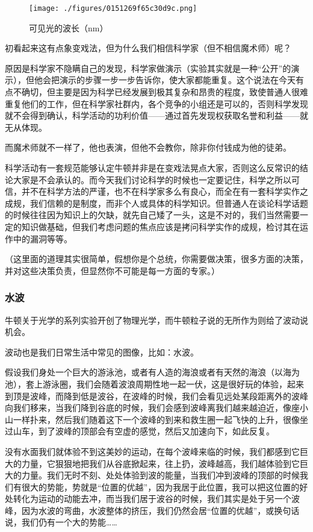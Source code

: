 \begin{figure}[ht]
\centering
\texttt{[image: ./figures/0151269f65c30d9c.png]}
\caption{可见光的波长（nm）} \label{fig_QMPre5_5}
\end{figure}

初看起来这有点象变戏法，但为什么我们相信科学家（但不相信魔术师）呢？

原因是科学家不隐瞒自己的发现，科学家做演示（实验其实就是一种“公开”的演示），但他会把演示的步骤一步一步告诉你，使大家都能重复。这个说法在今天有点不确切，但主要是因为科学已经发展到极其复杂和昂贵的程度，致使普通人很难重复他们的工作，但在科学家社群内，各个竞争的小组还是可以的，否则科学发现就不会得到确认，科学活动的功利价值——通过首先发现权获取名誉和利益——就无从体现。

而魔术师就不一样了，他也表演，但他不会教你，除非你付钱成为他的徒弟。

科学活动有一套规范能够认定牛顿并非是在变戏法晃点大家，否则这么反常识的结论大家是不会承认的。而今天我们讨论科学的时候也一定要记住，科学之所以可信，并不在科学方法的严谨，也不在科学家多么有良心，而全在有一套科学实作之成规，我们信赖的是制度，而非个人或具体的科学知识。但普通人在谈论科学话题的时候往往因为知识上的欠缺，就先自己矮了一头，这是不对的，我们当然需要一定的知识做基础，但我们考虑问题的焦点应该是拷问科学实作的成规，检讨其在运作中的漏洞等等。

（这里面的道理其实很简单，假想你是个总统，你需要做决策，很多方面的决策，并对这些决策负责，但显然你不可能是每一方面的专家。）

\subsubsection{水波}

牛顿关于光学的系列实验开创了物理光学，而牛顿粒子说的无所作为则给了波动说机会。

波动也是我们日常生活中常见的图像，比如：水波。

假设我们身处一个巨大的游泳池，或者有人造的海浪或者有天然的海浪（以海为池），套上游泳圈，我们会随着波浪周期性地一起一伏，这是很好玩的体验，起来到顶是波峰，而降到低是波谷，在波峰的时候，我们会看见远处某段距离外的波峰向我们移来，当我们降到谷底的时候，我们会感到波峰离我们越来越迫近，像座小山一样扑来，然后我们随着这下一个波峰的到来和救生圈一起飞快的上升，很像坐过山车，到了波峰的顶部会有空虚的感觉，然后又加速向下，如此反复。

没有水面我们就体验不到这美妙的运动，在每个波峰来临的时候，我们都感到它巨大的力量，它狠狠地把我们从谷底掀起来，往上扔，波峰越高，我们越体验到它巨大的力量。我们无时不刻、处处体验到波的能量，当我们冲到波峰的顶部的时候我们有很大的势能，势就是“位置的优越”，因为我居于此位置，我可以把这位置的好处转化为运动的动能去冲，而当我们居于波谷的时候，我们其实是处于另一个波峰，因为水波的弯曲，水波整体的挤压，我们仍然会居“位置的优越”，或换句话说，我们仍有一个大的势能……

